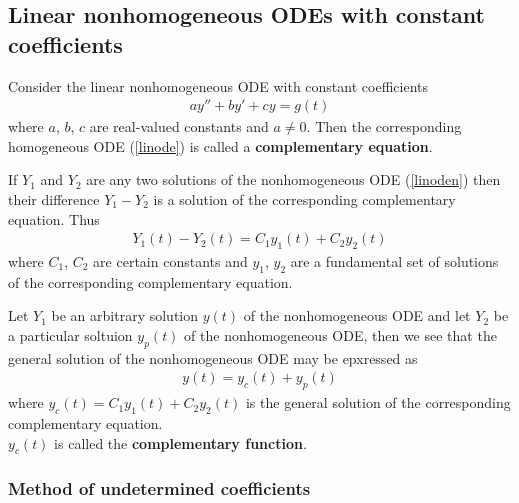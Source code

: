 \documentclass{article}
\begin{document}
\subsection{Linear nonhomogeneous ODEs with constant coefficients}


\begin{definition}
    Consider the linear nonhomogeneous ODE with constant coefficients
    \begin{align}
        \label{linoden}
        ay'' + by' + cy = g(t)
    \end{align}
    where $a$, $b$, $c$ are real-valued constants and $a\not=0$. Then
    the corresponding homogeneous ODE (\ref{linode}) is called a
    \textbf{complementary equation}.
\end{definition}

\begin{theorem}
    If $Y_1$ and $Y_2$ are any two solutions of the nonhomogeneous ODE
    (\ref{linoden}) then their difference $Y_1-Y_2$ is  a solution of the
    corresponding complementary equation. Thus
    \begin{align*}
        Y_1(t) - Y_2(t) = C_1y_1(t) + C_2y_2(t)
    \end{align*}
    where $C_1$, $C_2$ are certain constants and $y_1$, $y_2$ are a
    fundamental set of solutions of the corresponding complementary equation.
\end{theorem}

\begin{theorem}
    Let $Y_1$ be an arbitrary solution $y(t)$ of the nonhomogeneous ODE
    and let $Y_2$ be a particular soltuion $y_p(t)$ of the nonhomogeneous
    ODE, then we see that the general solution of the nonhomogeneous ODE
    may be epxressed as
    \begin{align*}
        y(t) = y_c(t) + y_p(t)
    \end{align*}
    where $y_c(t) = C_1y_1(t) + C_2y_2(t)$ is the general solution of the
    corresponding complementary equation.\\
    $y_c(t)$ is called the \textbf{complementary function}.
\end{theorem}

\subsubsection{Method of undetermined coefficients}
\end{document}
